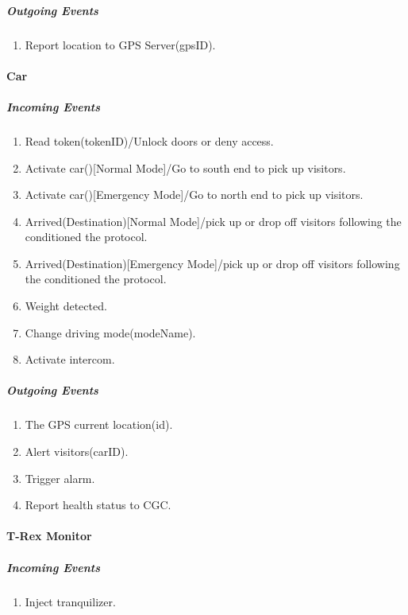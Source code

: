 \documentclass[12pt]{article}
\begin{document}
			\subparagraph{Outgoing Events}
				\begin{enumerate}
					\item Report location to GPS Server(gpsID). 
				\end{enumerate}

		\paragraph{Car}
		\textit{}
			\subparagraph{Incoming Events}
				\begin{enumerate}
					\item Read token(tokenID)/Unlock doors or deny access. 
                    \item Activate car()[Normal Mode]/Go to south end to pick up visitors.
                    \item Activate car()[Emergency Mode]/Go to north end to pick up visitors.
                    \item Arrived(Destination)[Normal Mode]/pick up or drop off visitors following the conditioned the protocol.
                    \item Arrived(Destination)[Emergency Mode]/pick up or drop off visitors following the conditioned the protocol.
					\item Weight detected.
                    \item Change driving mode(modeName).
                    \item Activate intercom.
				\end{enumerate}
				
			\subparagraph{Outgoing Events}
				\begin{enumerate}
                    \item The GPS current location(id).
                    \item Alert visitors(carID).
                    \item Trigger alarm. 
                    \item Report health status to CGC. 
				\end{enumerate}

		\paragraph{T-Rex Monitor}
		\textit{}
			\subparagraph{Incoming Events}
				\begin{enumerate}
					\item Inject tranquilizer. 
				\end{enumerate}
				
\end{document}
